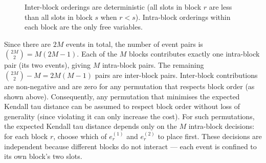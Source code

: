 \documentclass[11pt]{article}
\begin{document}
\begin{figure}[ht]
\centering
{}
\caption{Inter-block orderings are deterministic (all slots in block $r$ are less than all slots in block $s$ when $r < s$). Intra-block orderings within each block are the only free variables.}
\label{fig:interblock}
\end{figure}

Since there are $2M$ events in total, the number of event pairs is $\binom{2M}{2} = M(2M - 1)$. Each of the $M$ blocks contributes exactly one intra-block pair (its two events), giving $M$ intra-block pairs. The remaining $\binom{2M}{2} - M = 2M(M-1)$ pairs are inter-block pairs. Inter-block contributions are non-negative and are zero for any permutation that respects block order (as shown above). Consequently, any permutation that minimises the expected Kendall tau distance can be assumed to respect block order without loss of generality (since violating it can only increase the cost). For such permutations, the expected Kendall tau distance depends only on the $M$ intra-block decisions: for each block $r$, choose which of $e_r^{(1)}$ and $e_r^{(2)}$ to place first. These decisions are independent because different blocks do not interact --- each event is confined to its own block's two slots.
\end{document}
